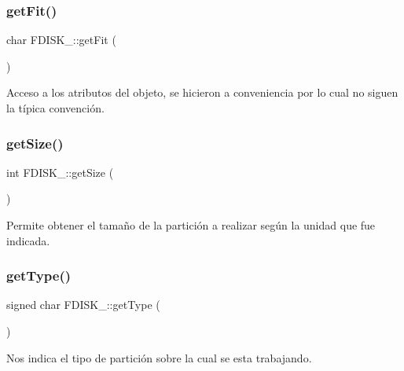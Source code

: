 \subsubsection{\texorpdfstring{get\+Fit()}{getFit()}}
{\footnotesize\ttfamily char F\+D\+I\+S\+K\+\_\+\+::get\+Fit (\begin{DoxyParamCaption}{ }\end{DoxyParamCaption})\hspace{0.3cm}{\ttfamily [inline]}}

Acceso a los atributos del objeto, se hicieron a conveniencia por lo cual no siguen la típica convención. \mbox{\label{classFDISK___a36811336ad11d30c712b2a9760286087}} 
\subsubsection{\texorpdfstring{get\+Size()}{getSize()}}
{\footnotesize\ttfamily int F\+D\+I\+S\+K\+\_\+\+::get\+Size (\begin{DoxyParamCaption}{ }\end{DoxyParamCaption})\hspace{0.3cm}{\ttfamily [inline]}}

Permite obtener el tamaño de la partición a realizar según la unidad que fue indicada. \mbox{\label{classFDISK___a7e5bbf0438a218aabb09bea7dfb2f9ef}} 
\subsubsection{\texorpdfstring{get\+Type()}{getType()}}
{\footnotesize\ttfamily signed char F\+D\+I\+S\+K\+\_\+\+::get\+Type (\begin{DoxyParamCaption}{ }\end{DoxyParamCaption})\hspace{0.3cm}{\ttfamily [inline]}}

Nos indica el tipo de partición sobre la cual se esta trabajando. \mbox{\label{classFDISK___abb61ba4d1545287d53bca288bc3ae244}} 
